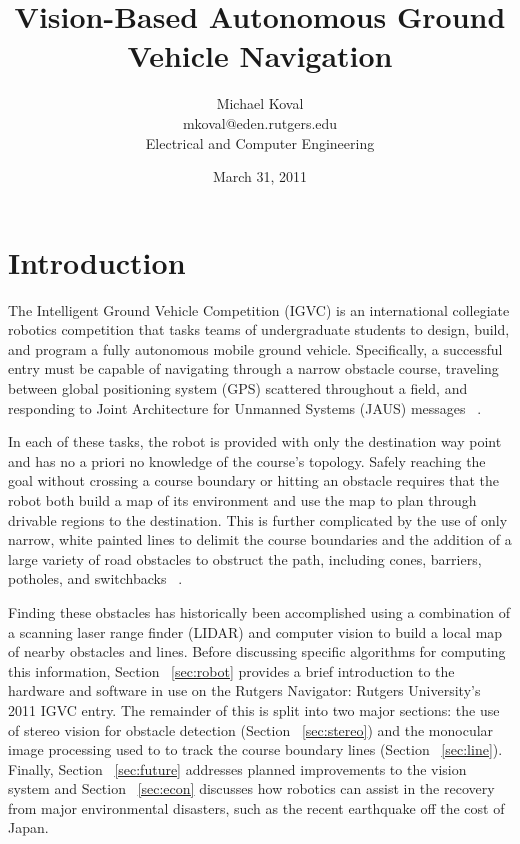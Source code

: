 \documentclass[twocolumn,11pt]{article}
\title{Vision-Based Autonomous Ground Vehicle Navigation}
\date{March 31, 2011}
\author{
	Michael Koval \\
	mkoval@eden.rutgers.edu \\
	Electrical and Computer Engineering
}
\begin{document}
\maketitle

\section{Introduction}
\label{sec:intro}
The Intelligent Ground Vehicle Competition (IGVC) is an international
collegiate robotics competition that tasks teams of undergraduate students to
design, build, and program a fully autonomous mobile ground vehicle.
Specifically, a successful entry must be capable of navigating through a narrow
obstacle course, traveling between  global positioning system (GPS) scattered
throughout a field, and responding to Joint Architecture for Unmanned Systems
(JAUS) messages ~\cite{igvc11}.

In each of these tasks, the robot is provided with only the destination
way point and has no a priori no knowledge of the course's topology. Safely
reaching the goal without crossing a course boundary or hitting an obstacle
requires that the robot both build a map of its environment and use the map to
plan through drivable regions to the destination. This is further complicated
by the use of only narrow, white painted lines to delimit the course boundaries
and the addition of a large variety of road obstacles to obstruct the path,
including cones, barriers, potholes, and switchbacks
~\cite{igvc11}.

Finding these obstacles has historically been accomplished using a combination
of a scanning laser range finder (LIDAR) and computer vision to build a local
map of nearby obstacles and lines.  Before discussing specific algorithms for
computing this information, Section ~\ref{sec:robot} provides a brief
introduction to the hardware and software in use on the Rutgers Navigator:
Rutgers University's 2011 IGVC entry. The remainder of this is split into two
major sections: the use of stereo vision for obstacle detection (Section
~\ref{sec:stereo}) and the monocular image processing used to to track the
course boundary lines (Section ~\ref{sec:line}). Finally, Section
~\ref{sec:future} addresses planned improvements to the vision system and
Section ~\ref{sec:econ} discusses how robotics can assist in the recovery from
major environmental disasters, such as the recent earthquake off the cost of
Japan.
\end{document}
